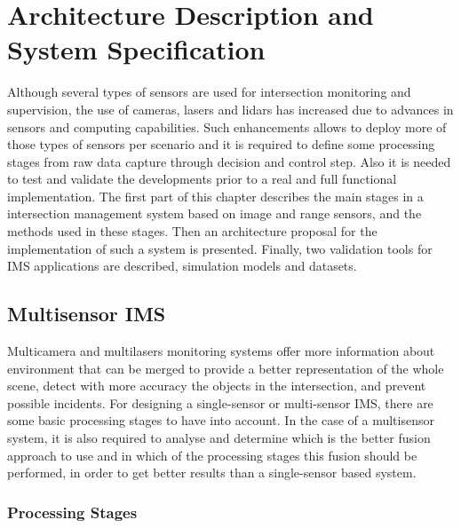 
\chapter [Architecture Description and System Specification]{Architecture Description and System Specification}

Although several types of sensors are used for intersection monitoring and supervision, the use of cameras, lasers and lidars has increased due to advances in sensors and computing capabilities. Such enhancements allows to deploy more of those types of sensors per scenario and it is required to define some processing stages from raw data capture through decision and control step. Also it is needed to test and validate the developments prior to a real and full functional implementation. The first part of this chapter describes the main stages in a intersection management system based on image and range sensors, and the methods used in these stages. Then an architecture proposal for the implementation of such a system is presented. Finally, two validation tools for IMS applications are described, simulation models and datasets.

\section{Multisensor IMS}

Multicamera and multilasers monitoring systems offer more information about environment that can be merged to provide a better representation of the whole scene, detect with more accuracy the objects in the intersection, and prevent possible incidents. For designing a single-sensor or multi-sensor IMS, there are some basic processing stages to have into account. In the case of a multisensor system, it is also required to analyse and determine which is the better fusion approach to use and in which of the processing stages this fusion should be performed, in order to get better results than a single-sensor based system.

\subsection{Processing Stages}

